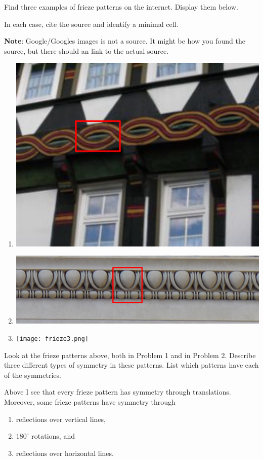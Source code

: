 \documentclass[noauthor,nooutcomes,hints,handout]{../ximera}
\begin{document}
\begin{question}
  Find three examples of frieze patterns on the internet.
  Display them below.

  In each case, cite the source and identify a minimal cell.
  
  \textbf{Note}: Google/Googles images is not a source. It might be how you found the source, but there should an link to the actual source.
  \begin{freeResponse}
    \begin{enumerate}
    \item \begin{center}
      \includegraphics[width=.6\textwidth]{frieze1.png}
    \end{center}
    \item
      \begin{center}
      \includegraphics[width=.6\textwidth]{frieze2.png}
      \end{center}
    \item
      \begin{center}
        \texttt{[image: frieze3.png]}
      \end{center}
    \end{enumerate}
  \end{freeResponse}
\end{question}
\mynewpage



\begin{question}
  Look at the frieze patterns above, both in Problem 1 and in Problem 2. Describe three different types of
  symmetry in these patterns. List which patterns have each of the symmetries.
  \begin{freeResponse}
    Above I see that every frieze pattern has symmetry through
    translations.  Moreover, some frieze patterns have symmetry
    through
    \begin{enumerate}
    \item reflections over vertical lines,
    \item $180^\circ$ rotations, and
    \item reflections over horizontal
      lines.
    \end{enumerate}
  \end{freeResponse}
\end{question}
\end{document}
